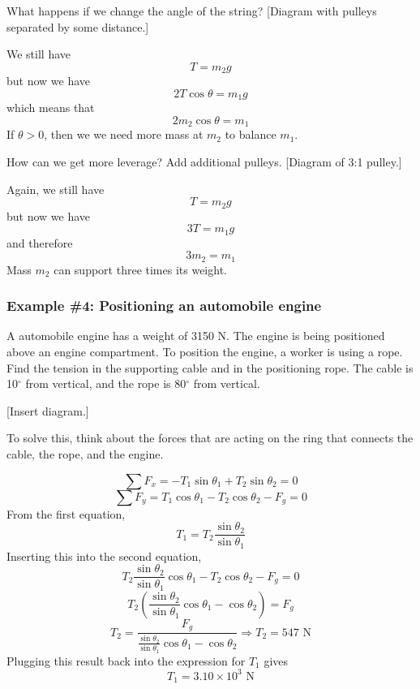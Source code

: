 What happens if we change the angle of the string?
[Diagram with pulleys separated by some distance.]
\vspace{4cm}

We still have
$$T=m_2g$$
but now we have
$$2T\cos\theta = m_1g$$
which means that
$$2m_2\cos\theta = m_1$$
If $\theta>0$, then we we need more mass at $m_2$ to balance $m_1$.

How can we get more leverage? Add additional pulleys.
[Diagram of 3:1 pulley.]
\vspace{4cm}

Again, we still have
$$T=m_2g$$
but now we have
$$3T = m_1g$$
and therefore
$$3m_2 = m_1$$
Mass $m_2$ can support three times its weight.


\subsubsection*{Example \#4: Positioning an automobile engine}
A automobile engine has a weight of 3150 N. The engine is being positioned above an engine compartment. To position the engine, a worker is using a rope. Find the tension in the supporting cable and in the positioning rope. The cable is 10$^\circ$ from vertical, and the rope is 80$^\circ$ from vertical.

[Insert diagram.]
\vspace{3cm}

To solve this, think about the forces that are acting on the ring that connects the cable, the rope, and the engine.

$$\sum F_x = -T_1\sin\theta_1+T_2\sin\theta_2=0$$
$$\sum F_y = T_1\cos\theta_1-T_2\cos\theta_2-F_g = 0$$
From the first equation,
$$T_1=T_2\frac{\sin\theta_2}{\sin\theta_1}$$
Inserting this into the second equation,
$$T_2\frac{\sin\theta_2}{\sin\theta_1}\cos\theta_1-T_2\cos\theta_2-F_g = 0$$
$$T_2\left(\frac{\sin\theta_2}{\sin\theta_1}\cos\theta_1-\cos\theta_2\right)=F_g$$
$$T_2=\frac{F_g}{\frac{\sin\theta_2}{\sin\theta_1}\cos\theta_1-\cos\theta_2}\Rightarrow \boxed{T_2=547\mbox{ N}}$$
Plugging this result back into the expression for $T_1$ gives
$$\boxed{T_1=3.10\times 10^3\mbox{ N}}$$



\clearpage
